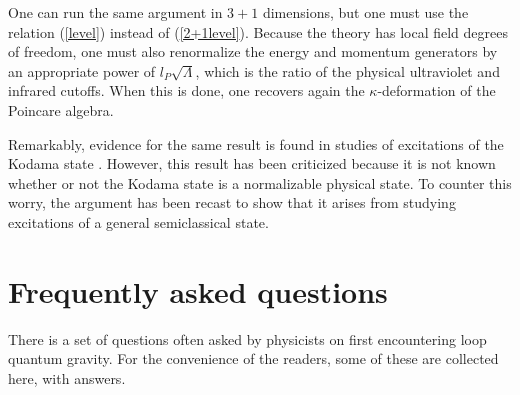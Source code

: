 \documentclass[12pt]{article}
\begin{document}
One can run the same argument in $3+1$ dimensions, but one must use 
the relation (\ref{level}) instead of (\ref{2+1level}).  Because the 
theory has local field degrees of freedom, one must also renormalize 
the energy and momentum generators by an appropriate power of
$l_{P}\sqrt{\Lambda}$, which is the ratio of the physical ultraviolet 
and infrared cutoffs. When this is done, one recovers again the 
$\kappa$-deformation of the Poincare algebra\cite{dsr2+1}. 

Remarkably, evidence for the same result is found in studies
of excitations of the Kodama state \cite{positive}.  However, this result has
been criticized because  it is not known whether or not the Kodama state
is a normalizable physical state. To counter this worry, the argument has
been recast to show that it arises from studying excitations of a general
semiclassical state\cite{semi-me}. 
  

\section{Frequently asked questions}

There is a set of questions often asked by physicists on first encountering loop quantum
gravity.  For the convenience of the readers, some of these are collected here, with answers.
\end{document}
